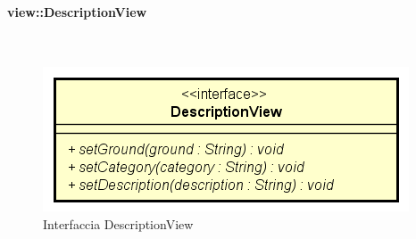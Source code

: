 \documentclass[../DefinizioneDiProdotto.tex]{subfiles}
\begin{document}
\paragraph{view::DescriptionView}
\
\begin{figure}[H]
	\centering
	\includegraphics[width=\maxwidth]{img/DescriptionView.png}
	\caption{Interfaccia DescriptionView}\label{fig:view::DescriptionView} 
\end{figure}
\end{document}
